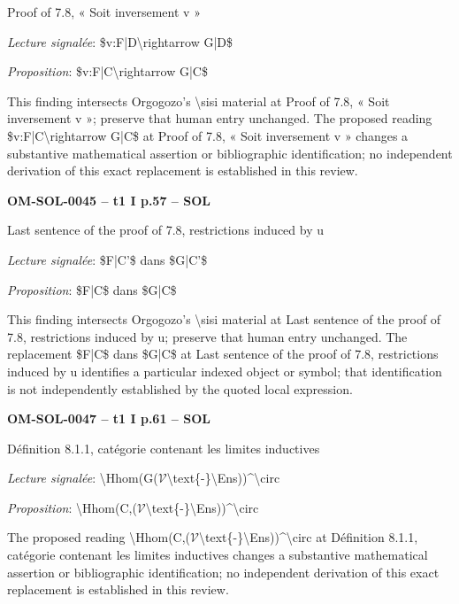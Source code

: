 Proof of 7.8, « Soit inversement v »\par
\emph{Lecture signalée}: \$v:F|D\textbackslash{}rightarrow G|D\$\par
\emph{Proposition}: \$v:F|C\textbackslash{}rightarrow G|C\$\par
This finding intersects Orgogozo's \textbackslash{}sisi material at Proof of 7.8, « Soit inversement v »; preserve that human entry unchanged. The proposed reading \$v:F|C\textbackslash{}rightarrow G|C\$ at Proof of 7.8, « Soit inversement v » changes a substantive mathematical assertion or bibliographic identification; no independent derivation of this exact replacement is established in this review.\par
\par\noindent\textbf{OM-SOL-0045 -- t1 I p.57 -- SOL}\par
Last sentence of the proof of 7.8, restrictions induced by u\par
\emph{Lecture signalée}: \$F|C'\$ dans \$G|C'\$\par
\emph{Proposition}: \$F|C\$ dans \$G|C\$\par
This finding intersects Orgogozo's \textbackslash{}sisi material at Last sentence of the proof of 7.8, restrictions induced by u; preserve that human entry unchanged. The replacement \$F|C\$ dans \$G|C\$ at Last sentence of the proof of 7.8, restrictions induced by u identifies a particular indexed object or symbol; that identification is not independently established by the quoted local expression.\par
\par\noindent\textbf{OM-SOL-0047 -- t1 I p.61 -- SOL}\par
Définition 8.1.1, catégorie contenant les limites inductives\par
\emph{Lecture signalée}: \textbackslash{}Hhom(G(\ensuremath{𝒱}\textbackslash{}text\{-\}\textbackslash{}Ens))\textasciicircum{}\textbackslash{}circ\par
\emph{Proposition}: \textbackslash{}Hhom(C,(\ensuremath{𝒱}\textbackslash{}text\{-\}\textbackslash{}Ens))\textasciicircum{}\textbackslash{}circ\par
The proposed reading \textbackslash{}Hhom(C,(\ensuremath{𝒱}\textbackslash{}text\{-\}\textbackslash{}Ens))\textasciicircum{}\textbackslash{}circ at Définition 8.1.1, catégorie contenant les limites inductives changes a substantive mathematical assertion or bibliographic identification; no independent derivation of this exact replacement is established in this review.\par
